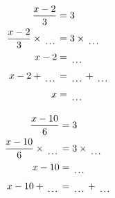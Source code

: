 \documentclass[12pt]{article}
\newcounter{minipagecount}
\begin{document}
\begin{multicols}{2}
\begin{minipage}[t]{0.45\textwidth}
    \raggedright %
    \begin{align*} %
        \frac{x - 2}{3} &= 3\\
        \frac{x - 2}{3} \times\dotuline{\hspace{5mm}} &= 3 \times\dotuline{\hspace{5mm}}\\
        x - 2 &= \dotuline{\hspace{5mm}}\\
        x - 2 + \dotuline{\hspace{5mm}} &= \dotuline{\hspace{5mm}} + \dotuline{\hspace{5mm}}\\
        x &= \dotuline{\hspace{5mm}}\\
    \end{align*}
\end{minipage}\columnbreak
\noindent{(\theminipagecount)}\hspace{0.1mm} %
\begin{minipage}[t]{0.45\textwidth} %
    \vspace{-26pt}  %
    \raggedright %
    \begin{align*} %
        \frac{x - 10}{6} &= 3\\
        \frac{x - 10}{6} \times\dotuline{\hspace{5mm}} &= 3 \times\dotuline{\hspace{5mm}}\\
        x - 10 &= \dotuline{\hspace{5mm}}\\
        x - 10 + \dotuline{\hspace{5mm}} &= \dotuline{\hspace{5mm}} + \dotuline{\hspace{5mm}}\\

\end{align*}
\end{minipage}
\end{multicols}
\end{document}

